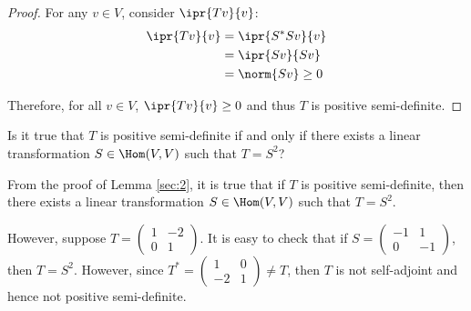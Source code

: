 \documentclass[11pt]{scrartcl}
\begin{document}
\begin{proof}
  For any $v\in V$, consider $\ipr{Tv}{v}$:
  \begin{align}
    \ipr{Tv}{v} & = \ipr{S^{*}Sv}{v} \\
                & =\ipr{Sv}{Sv}\\
                &=\norm{Sv}\geq 0
  \end{align}

  Therefore, for all $v\in V$, $\ipr{Tv}{v}\geq 0$ and thus $T$ is
  positive semi-definite.
\end{proof}

\begin{ques}
  Is it true that $T$ is positive semi-definite if and only if there exists a linear transformation
  $S \in \Hom(V,V)$ such that $T=S^2$?
\end{ques}

\begin{answer*}

  From the proof of Lemma \ref{sec:2}, it is true that if $T$ is
  positive semi-definite, then there exists a linear transformation
  $S \in \Hom(V,V)$ such that $T=S^2$.

  However, suppose $T=
  \begin{pmatrix}
    1  & -2 \\
    0  & 1
  \end{pmatrix}
  $. It is easy to check that if $S = 
  \begin{pmatrix}
    -1 & 1  \\
    0  & -1
  \end{pmatrix}
  $, then $T = S^2$. However, since $T^{*}= 
  \begin{pmatrix}
    1  & 0  \\
    -2 & 1
  \end{pmatrix}\neq T$, then $T$ is not self-adjoint and hence not positive semi-definite.

\end{answer*}
\end{document}
